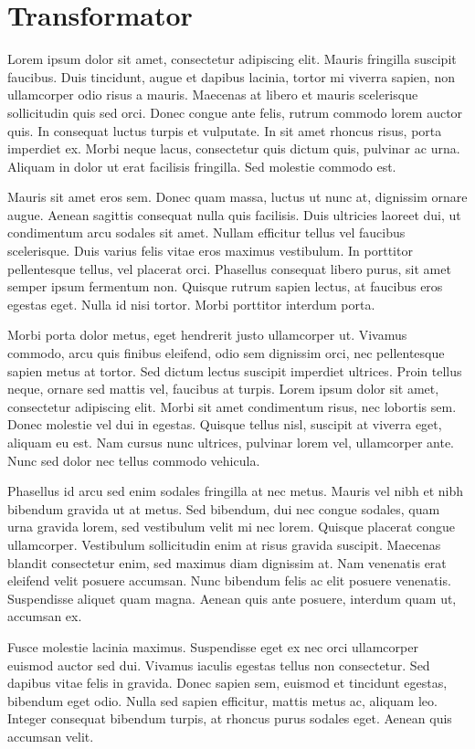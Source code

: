 \section{Transformator}
Lorem ipsum dolor sit amet, consectetur adipiscing elit. Mauris fringilla suscipit faucibus. Duis tincidunt, augue et dapibus lacinia, tortor mi viverra sapien, non ullamcorper odio risus a mauris. Maecenas at libero et mauris scelerisque sollicitudin quis sed orci. Donec congue ante felis, rutrum commodo lorem auctor quis. In consequat luctus turpis et vulputate. In sit amet rhoncus risus, porta imperdiet ex. Morbi neque lacus, consectetur quis dictum quis, pulvinar ac urna. Aliquam in dolor ut erat facilisis fringilla. Sed molestie commodo est.

Mauris sit amet eros sem. Donec quam massa, luctus ut nunc at, dignissim ornare augue. Aenean sagittis consequat nulla quis facilisis. Duis ultricies laoreet dui, ut condimentum arcu sodales sit amet. Nullam efficitur tellus vel faucibus scelerisque. Duis varius felis vitae eros maximus vestibulum. In porttitor pellentesque tellus, vel placerat orci. Phasellus consequat libero purus, sit amet semper ipsum fermentum non. Quisque rutrum sapien lectus, at faucibus eros egestas eget. Nulla id nisi tortor. Morbi porttitor interdum porta.

Morbi porta dolor metus, eget hendrerit justo ullamcorper ut. Vivamus commodo, arcu quis finibus eleifend, odio sem dignissim orci, nec pellentesque sapien metus at tortor. Sed dictum lectus suscipit imperdiet ultrices. Proin tellus neque, ornare sed mattis vel, faucibus at turpis. Lorem ipsum dolor sit amet, consectetur adipiscing elit. Morbi sit amet condimentum risus, nec lobortis sem. Donec molestie vel dui in egestas. Quisque tellus nisl, suscipit at viverra eget, aliquam eu est. Nam cursus nunc ultrices, pulvinar lorem vel, ullamcorper ante. Nunc sed dolor nec tellus commodo vehicula.

Phasellus id arcu sed enim sodales fringilla at nec metus. Mauris vel nibh et nibh bibendum gravida ut at metus. Sed bibendum, dui nec congue sodales, quam urna gravida lorem, sed vestibulum velit mi nec lorem. Quisque placerat congue ullamcorper. Vestibulum sollicitudin enim at risus gravida suscipit. Maecenas blandit consectetur enim, sed maximus diam dignissim at. Nam venenatis erat eleifend velit posuere accumsan. Nunc bibendum felis ac elit posuere venenatis. Suspendisse aliquet quam magna. Aenean quis ante posuere, interdum quam ut, accumsan ex.

Fusce molestie lacinia maximus. Suspendisse eget ex nec orci ullamcorper euismod auctor sed dui. Vivamus iaculis egestas tellus non consectetur. Sed dapibus vitae felis in gravida. Donec sapien sem, euismod et tincidunt egestas, bibendum eget odio. Nulla sed sapien efficitur, mattis metus ac, aliquam leo. Integer consequat bibendum turpis, at rhoncus purus sodales eget. Aenean quis accumsan velit.